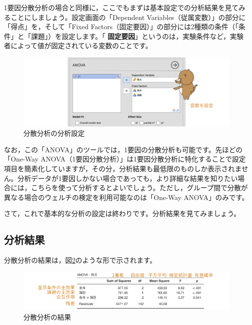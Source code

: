 \documentclass[
  12pt,
  a5jpaper,
  lualatex, ja=standard]{bxjsbook}
\renewcommand{\emph}[1]{\textbf{\color{emph} #1}}
\begin{document}
1要因分散分析の場合と同様に，ここでもまずは基本設定での分析結果を見てみることにしましょう。設定画面の「Dependent Variables（従属変数）」の部分に「得点」を，そして「Fixed Factors（固定要因）」の部分には2種類の条件（「条件」と「課題」）を設定します。「\emph{固定要因}」というのは，実験条件など，実験者によって値が固定されている変数のことです。

\begin{figure}[!ht]

{\centering \includegraphics[width=1\linewidth]{images/ANOVA/anova-setvar} 

}

\caption{分散分析の分析設定}\label{fig:ANOVA-anova-setvar}
\end{figure}

なお，この「ANOVA」のツールでは，1要因の分散分析も可能です。先ほどの「One-Way ANOVA（1要因分散分析）」は1要因分散分析に特化することで設定項目を簡素化していますが，その分，分析結果も最低限のものしか表示されません。分析データが1要因しかない場合であっても，より詳細な結果を知りたい場合には，こちらを使って分析するとよいでしょう。ただし，グループ間で分散が異なる場合のウェルチの検定を利用可能なのは「One-Way ANOVA」のみです。

さて，これで基本的な分析の設定は終わりです。分析結果を見てみましょう。

\hypertarget{sub:ANOVA-anova-results}{%
\subsection{分析結果}\label{sub:ANOVA-anova-results}}

分散分析の結果は，図\ref{fig:ANOVA-anova-results}のような形で示されます。

\begin{figure}[!ht]

{\centering \includegraphics[width=1\linewidth]{images/ANOVA/anova-results} 

}

\caption{分散分析の結果}\label{fig:ANOVA-anova-results}
\end{figure}
\end{document}
